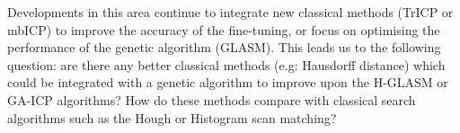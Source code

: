 \documentclass[authoryearcitations]{UoYCSproject}
\begin{document}
Developments in this area continue to integrate new classical methods (TrICP or mbICP) to improve the accuracy of the fine-tuning, or focus on optimising the performance of the genetic algorithm (GLASM). This leads us to the following question: are there any better classical methods (e.g: Hausdorff distance) which could be integrated with a genetic algorithm to improve upon the H-GLASM or GA-ICP algorithms? How do these methods compare with classical search algorithms such as the Hough or Histogram scan matching?
 
\cleardoublepage



\end{document}
